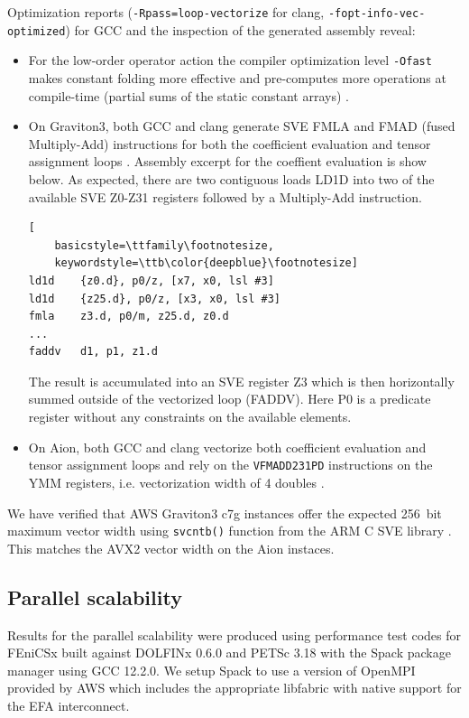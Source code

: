 Optimization reports (\texttt{-Rpass=loop-vectorize} for clang,
\texttt{-fopt-info-vec-optimized}) for GCC and the inspection of the generated
assembly reveal:
\begin{itemize}
    \item For the low-order operator action the compiler optimization level
    \lstinline{-Ofast} makes constant folding more effective and pre-computes
    more operations at compile-time (partial sums of the static constant arrays)
    \citep{GodboltArmClangDeg1}.
    \item On Graviton3, both GCC and clang generate SVE FMLA and FMAD (fused
    Multiply-Add) instructions \citep{ArmReferenceManual} for both the
    coefficient evaluation and tensor assignment loops
    \citep{GodboltArmClang,GodboltArmGCC}. Assembly excerpt for the coeffient
    evaluation is show below. As expected, there are two contiguous loads LD1D
    into two of the available SVE Z0-Z31 registers followed by a Multiply-Add
    instruction.
\begin{lstlisting}[
    basicstyle=\ttfamily\footnotesize,
    keywordstyle=\ttb\color{deepblue}\footnotesize]
ld1d    {z0.d}, p0/z, [x7, x0, lsl #3]
ld1d    {z25.d}, p0/z, [x3, x0, lsl #3]
fmla    z3.d, p0/m, z25.d, z0.d
...
faddv   d1, p1, z1.d
\end{lstlisting}
    The result is accumulated into an SVE register Z3 which is then horizontally
    summed outside of the vectorized loop (FADDV). Here P0 is a predicate
    register without any constraints on the available elements.
    \item On Aion, both GCC and clang vectorize both coefficient evaluation and
    tensor assignment loops and rely on the \lstinline{VFMADD231PD} instructions
    on the YMM registers, i.e. vectorization width of 4 doubles
    \citep{Godboltx86Clang,Godboltx86GCC}.
\end{itemize}

We have verified that AWS Graviton3 c7g instances offer the expected
\SI{256}{bit} maximum vector width using \lstinline{svcntb()} function from the
ARM C SVE library \citep{ArmCLangExtensions}. This matches the AVX2 vector width
on the Aion instaces.

\subsection*{Parallel scalability}

Results for the parallel scalability were produced using performance test codes
for FEniCSx \citep{Wells2023} built against DOLFINx 0.6.0 and PETSc 3.18
\citep{petsc} with the Spack package manager using GCC 12.2.0. We setup Spack to
use a version of OpenMPI provided by AWS which includes the appropriate
libfabric with native support for the EFA interconnect.


